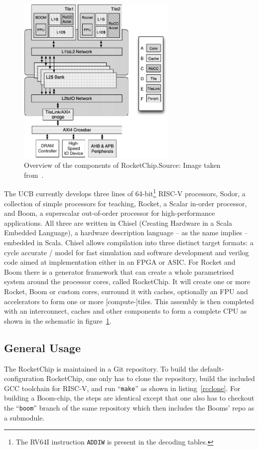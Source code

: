 \documentclass[journal,a4paper]{IEEEtran}
\newcommand{\source}[1]{Source: #1}
\begin{document}
\begin{figure}[!t]
	\centering
	\includegraphics[width=3in]{rcov}
	\caption{Overview of the components of RocketChip.\newline\hspace{\linewidth}\source{Image taken from~\cite{rocket}}.}
	\label{rcov}
\end{figure}
The UCB currently develops three lines of 64-bit\footnote{The RV64I instruction \texttt{ADDIW}\cite[p.28]{riscv} is present in the decoding tables\cite{code-tables}.}  RISC-V processors, Sodor\cite{sodor}, a collection of simple processors for teaching, Rocket\cite[p.4]{rocket}, a Scalar in-order processor, and Boom\cite{boom}, a superscalar out-of-order processor for high-performance applications.
All three are written in Chisel (Creating Hardware in a Scala Embedded Language), a hardware description language -- as the name implies -- embedded in Scala.
Chisel allows compilation into three distinct target formats: a cycle accurate \CC/ model for fast simulation and software development and verilog code aimed at implementation either in an FPGA or ASIC\@.
For Rocket and Boom there is a generator framework that can create a whole parametrised system around the processor cores, called RocketChip\cite{rocket}.
It will create one or more Rocket, Boom or custom cores, surround it with caches, optionally an FPU and accelerators to form one or more [compute-]tiles.
This assembly is then completed with an interconnect, caches and other components to form a complete CPU as shown in the schematic in figure~\ref{rcov}.


\subsection{General Usage}
The RocketChip is maintained in a Git repository\cite{rc-github}.
To build the default-configuration RocketChip, one only has to clone the repository, build the included GCC toolchain for RISC-V, and run ``\texttt{make}'' as shown in listing~\ref{rcclone}. For building a Boom-chip, the steps are identical except that one also has to checkout the ``\texttt{boom}'' branch of the same repository which then includes the Booms' repo\cite{boom-github} as a submodule.
\end{document}
